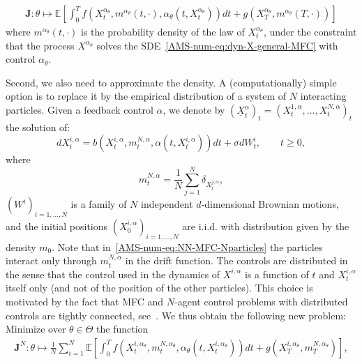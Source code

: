 \documentclass{amsproc}
\theoremstyle{definition}
\theoremstyle{remark}
\numberwithin{equation}{section}
\newcommand{\EE}{{\mathbb E}}
\newcommand{\bJ}{{\mathbf J}}
\newcommand{\ctrl}{\alpha}
\begin{document}
\begin{align*}
	\bJ: \theta \mapsto \EE \left[\int_0^T f(X_t^{\ctrl_\theta}, m^{\ctrl_\theta}(t,\cdot), \ctrl_\theta(t,X_t^{\ctrl_\theta}) ) dt + g(X_T^{\ctrl_\theta}, m^{\ctrl_\theta}(T,\cdot)) \right]
\end{align*}
where $m^{\ctrl_\theta}(t,\cdot)$ is the probability density of the law of $X_t^{\ctrl_\theta}$, under the constraint that the process $X^{\ctrl_\theta}$ solves the SDE~\eqref{AMS-num-eq:dyn-X-general-MFC} with control $\ctrl_\theta$.



Second, we also need to approximate the density. A (computationally) simple option is to replace it by the empirical distribution of a system of $N$ interacting particles. Given a feedback control $\ctrl$, we denote by $(\underline X_t^{\ctrl})_{t} = (X_t^{1, \ctrl}, \dots, X_t^{N, \ctrl})_{t}$ the solution of:
\begin{equation}
\label{AMS-num-eq:NN-MFC-Nparticles}
	d X_t^{i, \ctrl} = b(X_t^{i, \ctrl}, m^{N, \ctrl}_t, \ctrl(t, X_t^{i, \ctrl})) dt + \sigma d W^i_t, \qquad t \ge 0,
\end{equation}
where 
$$
	m^{N, \ctrl}_t = \frac{1}{N} \sum_{j=1}^N \delta_{X_t^{j, \ctrl}}, 
$$ 
$(W^i)_{i=1,\dots,N}$ is a family of $N$ independent $d$-dimensional Brownian motions, and the initial positions $(X_0^{i, \ctrl})_{i=1,\dots,N}$ are i.i.d. with distribution given by the density $m_0$. Note that in~\eqref{AMS-num-eq:NN-MFC-Nparticles} the particles interact only through $m^{N, \ctrl}_t$ in the drift function. The controls are distributed in the sense that the control used in the dynamics of $X^{i, \ctrl}$ is a function of $t$ and $X_t^{i, \ctrl}$ itself only (and not of the position of the other particles). This choice is motivated by the fact that MFC and $N$-agent control problems with distributed controls are tightly connected, see~\cite{MR3753660}. We thus obtain the following new problem: Minimize over $\theta \in \Theta$ the function
\begin{align*}
	\bJ^{N}: \theta \mapsto \frac{1}{N} \sum_{i=1}^N \EE \left[\int_0^T f(X_t^{i, \ctrl_\theta}, m^{N, \ctrl_\theta}_t, \ctrl_\theta(t,X_t^{i, \ctrl_\theta}) ) dt + g(X_T^{i, \ctrl_\theta}, m^{N,\ctrl_\theta}_T) \right],
\end{align*}
\end{document}
